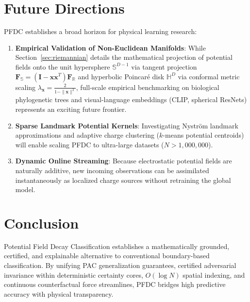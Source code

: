 \documentclass[preprint,review,12pt]{elsarticle}
\newcommand{\FloatBarrier}{\clearpage}
\begin{document}
\section{Future Directions}
PFDC establishes a broad horizon for physical learning research:
\begin{enumerate}
    \item \textbf{Empirical Validation of Non-Euclidean Manifolds}: While Section~\ref{sec:riemannian} details the mathematical projection of potential fields onto the unit hypersphere $\mathbb{S}^{D-1}$ via tangent projection $\mathbf{F}_{\mathbb{S}} = (\mathbf{I} - \mathbf{x}\mathbf{x}^T)\mathbf{F}_{\mathbb{R}}$ and hyperbolic Poincar\'e disk $\mathbb{H}^D$ via conformal metric scaling $\lambda_{\mathbf{x}} = \frac{2}{1 - \|\mathbf{x}\|^2}$, full-scale empirical benchmarking on biological phylogenetic trees and visual-language embeddings (CLIP, spherical ResNets) represents an exciting future frontier.
    \item \textbf{Sparse Landmark Potential Kernels}: Investigating Nystr\"om landmark approximations and adaptive charge clustering ($k$-means potential centroids) will enable scaling PFDC to ultra-large datasets ($N > 1,000,000$).
    \item \textbf{Dynamic Online Streaming}: Because electrostatic potential fields are naturally additive, new incoming observations can be assimilated instantaneously as localized charge sources without retraining the global model.
\end{enumerate}


\FloatBarrier

\section{Conclusion}
Potential Field Decay Classification establishes a mathematically grounded, certified, and explainable alternative to conventional boundary-based classification. By unifying PAC generalization guarantees, certified adversarial invariance within deterministic certainty cores, $O(\log N)$ spatial indexing, and continuous counterfactual force streamlines, PFDC bridges high predictive accuracy with physical transparency.



\end{document}
